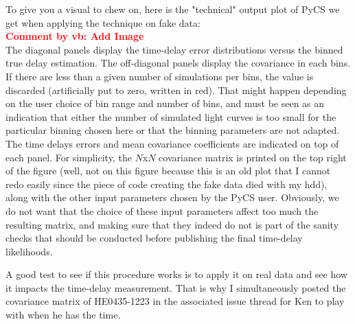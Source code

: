 \documentclass[11pt]{scrartcl}
\newcommand{\com}[2]{\xspace\textcolor{red}{\textbf{Comment by #1: #2}}}
\begin{document}
To give you a visual to chew on, here is the "technical" output plot of 
PyCS we get when applying the technique on fake data:\\

\com{vb}{Add Image}\\

The diagonal panels display the time-delay error distributions versus 
the binned true delay estimation. The off-diagonal panels display the 
covariance in each bins. If there are less than a given number of 
simulations per bins, the value is discarded (artificially put to zero, 
written in red). That might happen depending on the user choice of bin 
range and number of bins, and must be seen as an indication that either 
the number of simulated light curves is too small for the particular 
binning chosen here or that the binning parameters are not adapted. The 
time delays errors and mean covariance coefficients are indicated on 
top of each panel. For simplicity, the $N$x$N$ covariance matrix  
is printed on the top right of the figure (well, not on this figure 
because this is an old plot that I cannot redo easily since the piece 
of code creating the fake data died with my hdd), along with the 
other input parameters chosen by the PyCS user. Obviously, we do not 
want that the choice of these input parameters affect too much the 
resulting matrix, and making sure that they indeed do not is part of 
the sanity 
checks that should be conducted before publishing the final time-delay 
likelihoods.

A good test to see if this procedure works is to apply it on real data 
and see how it impacts the time-delay measurement. That is why I 
simultaneously posted the covariance matrix of HE0435-1223 in the 
associated issue thread for Ken to play with when he has the time. 
\end{document}
